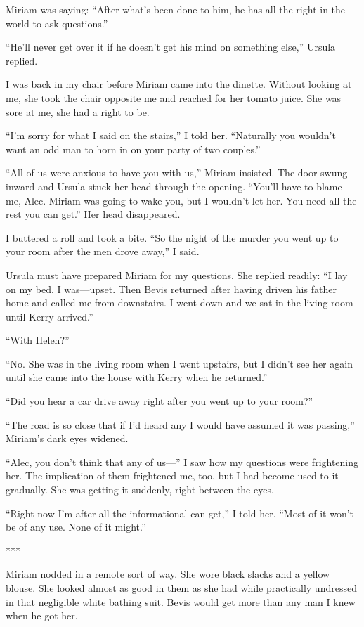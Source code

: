 {Miriam was saying: “After what’s been done to him, he has all the right in the world to ask questions.”

“He’ll never get over it if he doesn’t get his mind on something else,” Ursula replied.

I was back in my chair before Miriam came into the dinette. Without looking at me, she took the chair opposite me and reached for her tomato juice. She was sore at me, she had a right to be.

“I’m sorry for what I said on the stairs,” I told her. “Naturally you wouldn’t want an odd man to horn in on your party of two couples.”

“All of us were anxious to have you with us,” Miriam insisted. The door swung inward and Ursula stuck her head through the opening. “You’ll have to blame me, Alec. Miriam was going to wake you, but I wouldn’t let her. You need all the rest you can get.” Her head disappeared.

I buttered a roll and took a bite. “So the night of the murder you went up to your room after the men drove away,” I said.

Ursula must have prepared Miriam for my questions. She replied readily: “I lay on my bed. I was—upset. Then Bevis returned after having driven his father home and called me from downstairs. I went down and we sat in the living room until Kerry arrived.”

“With Helen?”

“No. She was in the living room when I went upstairs, but I didn’t see her again until she came into the house with Kerry when he returned.”

“Did you hear a car drive away right after you went up to your room?”

“The road is so close that if I’d heard any I would have assumed it was passing,” Miriam’s dark eyes widened.

“Alec, you don’t think that any of us—” I saw how my questions were frightening her. The implication of them frightened me, too, but I had become used to it gradually. She was getting it suddenly, right between the eyes.

“Right now I’m after all the informational can get,” I told her. “Most of it won’t be of any use. None of it might.”

***

Miriam nodded in a remote sort of way. She wore black slacks and a yellow blouse. She looked almost as good in them as she had while practically undressed in that negligible white bathing suit. Bevis would get more than any man I knew when he got her.

}
